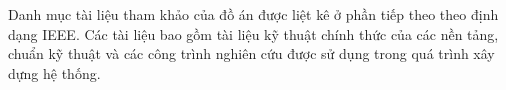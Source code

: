 \documentclass[../DoAn.tex]{subfiles}
\begin{document}
Danh mục tài liệu tham khảo của đồ án được liệt kê ở phần tiếp theo theo định dạng IEEE. Các tài liệu bao gồm tài liệu kỹ thuật chính thức của các nền tảng, chuẩn kỹ thuật và các công trình nghiên cứu được sử dụng trong quá trình xây dựng hệ thống.
\end{document}
